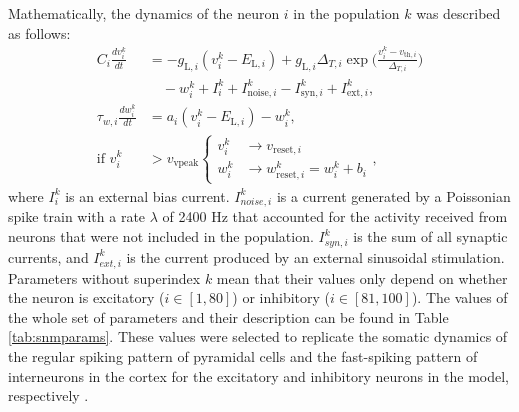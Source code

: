 \documentclass[../main.tex]{subfiles}
\begin{document}
Mathematically, the dynamics of the neuron $i$ in the population $k$ was described as follows:
\begin{equation}
    \begin{aligned}
    C_{i}\displaystyle\frac{dv^k_i}{dt} &= -g_{\text{L},i}(v^k_i-E_{\text{L},i})+g_{\text{L},i}\Delta_{T,i} \exp \Bigg( \displaystyle\frac{v_i^k-v_{\text{th},i}}{\Delta_{T,i}} \Bigg) \\ 
    & \quad-w^k_i+I^k_i+I^k_{\text{noise},i}-I^k_{\text{syn},i} + I^k_{\text{ext},i},\\
    \tau_{w,i}\displaystyle\frac{dw^k_i}{dt} &= a_i(v^k_i-E_{\text{L},i})-w^k_i,\\
    \text{if } v^k_i & > v_\text{vpeak} 
    \begin{cases}
      v^k_i & \rightarrow v_{\text{reset},i}\\
      w^k_i & \rightarrow w^k_{\text{reset},i} = w^k_i+b_i
    \end{cases},
    \end{aligned}
    \label{eq:snm_aeif}
\end{equation}
where $I_i^k$ is an external bias current.
$I_{noise,i}^{k}$ is a current generated by a Poissonian spike train with a rate $\lambda$ of 2400 Hz that accounted for the activity received from neurons that were not included in the population.
$I_{syn,i}^{k}$ is the sum of all synaptic currents, and $I_{ext,i}^{k}$ is the current produced by an external sinusoidal stimulation.
Parameters without superindex $k$ mean that their values only depend on whether the neuron is excitatory ($i \in [1,80]$) or inhibitory ($i \in [81,100]$).
The values of the whole set of parameters and their description can be found in Table \ref{tab:snmparams}.
These values were selected to replicate the somatic dynamics of the regular spiking pattern of pyramidal cells and the fast-spiking pattern of interneurons in the cortex for the excitatory and inhibitory neurons in the model, respectively \citep{naud_firing_2008}.
\end{document}

